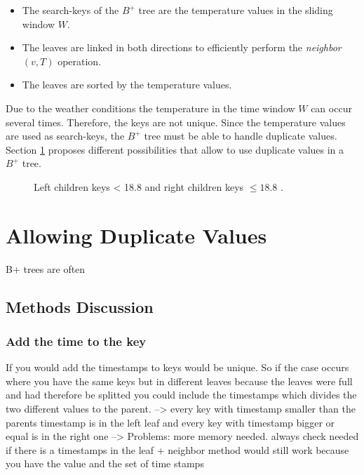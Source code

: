 \documentclass[abstracton,12pt]{scrreprt}
\begin{document}
\begin{itemize}  
	\item The search-keys of the $B^+$ tree are the temperature values in the sliding window $W$.
	\item The leaves are linked in both directions to efficiently perform the \emph{neighbor}$(v,T)$ operation.
	\item The leaves are sorted by the temperature values.\\ 
\end{itemize}
Due to the weather conditions the temperature in the time window $W$ can occur several times. Therefore, the keys are not unique. Since the temperature values are used as search-keys, the $B^+$ tree must be able to handle duplicate values. Section \ref{allowDV} proposes different possibilities that allow to use duplicate values in a $B^+$ tree. 
\begin{figure}[H]
	\centering
	\vspace{2mm}
	\caption{Left children keys < 18.8 and right children keys $\leq 18.8$ .}
	\label{lessOrEqual}
\end{figure}


\section{Allowing Duplicate Values}
\label{allowDV}
B+ trees are often 

\subsection{Methods Discussion}

\subsubsection{Add the time to the key}
If you would add the timestamps to keys would be unique. So if the case occurs where you have the same keys but in different leaves because the leaves were full and had therefore be splitted you could include the timestamps which divides the two different values to the parent. --> every key with timestamp smaller than the parents timestamp is in the left leaf and every key with timestamp bigger or equal is in the right one --> 
Problems: more memory needed. always check needed if there is a timestamps in the leaf
+ neighbor method would still work because you have the value and the set of time stamps 
\end{document}
